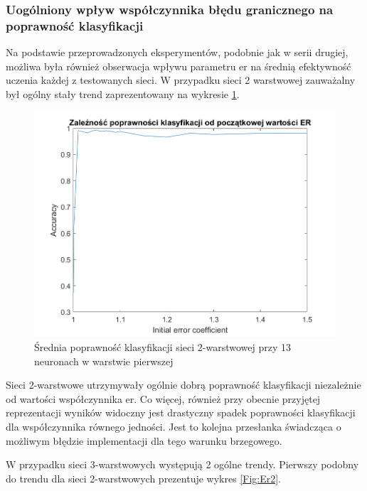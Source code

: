 \documentclass[12pt,twoside]{article}
\begin{document}
\clearpage
\subsubsection{Uogólniony wpływ współczynnika błędu granicznego na poprawność klasyfikacji}
Na podstawie przeprowadzonych eksperymentów, podobnie jak w serii drugiej, możliwa była również obserwacja wpływu parametru er na średnią efektywność uczenia każdej z testowanych sieci.
W przypadku sieci 2 warstwowej zauważalny był ogólny stały trend zaprezentowany na wykresie \ref{Fig:Er1}.

\begin{figure}[ht]
	\centering
	\includegraphics[width=16cm]{figures/Er_1.png}
	\caption{Średnia poprawność klasyfikacji sieci 2-warstwowej przy 13 neuronach w warstwie pierwszej}
	\label{Fig:Er1}
\end{figure}

Sieci 2-warstwowe utrzymywały ogólnie dobrą poprawność klasyfikacji niezależnie od wartości współczynnika er.
Co więcej, również przy obecnie przyjętej reprezentacji wyników widoczny jest drastyczny spadek poprawności klasyfikacji dla współczynnika równego jedności.
Jest to kolejna przesłanka świadcząca o możliwym błędzie implementacji dla tego warunku brzegowego.

W przypadku sieci 3-warstwowych występują 2 ogólne trendy.
Pierwszy podobny do trendu dla sieci 2-warstwowych prezentuje wykres \ref{Fig:Er2}.
\end{document}
